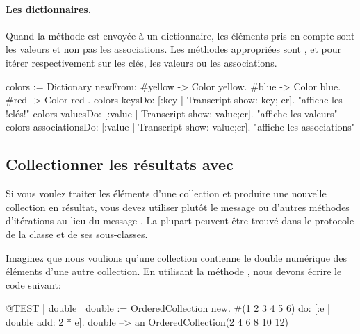 \documentclass[a4paper,10pt,twoside]{book}
\begin{document}


\paragraph{Les dictionnaires.}
Quand la m\'ethode  est envoy\'ee \`a un dictionnaire,
les \'el\'ements pris en compte sont les valeurs et non pas les associations.
Les m\'ethodes appropri\'ees sont ,  et  pour it\'erer respectivement sur les cl\'es, les valeurs ou les associations.

\begin{code}{}
colors := Dictionary newFrom: { #yellow -> Color yellow. #blue -> Color blue. #red -> Color red }.
colors keysDo: [:key | Transcript show: key; cr].                    "affiche les !cl\'es!"
colors valuesDo: [:value | Transcript show: value;cr].            "affiche les valeurs"
colors associationsDo: [:value | Transcript show: value;cr].  "affiche les associations"
\end{code}

\subsection{Collectionner les r\'esultats avec }
Si vous voulez traiter les \'el\'ements d'une collection et produire
une nouvelle collection en r\'esultat, vous devez utiliser plut\^ot le
message  ou d'autres m\'ethodes d'it\'erations au lieu
du message .
La plupart peuvent \^etre trouv\'e dans le protocole  
de la classe  et de ses sous-classes.

Imaginez que nous voulions qu'une collection contienne le double 
num\'erique des \'el\'ements d'une autre collection. 
En utilisant la m\'ethode , nous devons \'ecrire le code suivant:

\begin{code}{@TEST | double |}
double := OrderedCollection new.
#(1 2 3 4 5 6) do: [:e | double add: 2 * e].
double --> an OrderedCollection(2 4 6 8 10 12)
\end{code}
\end{document}
